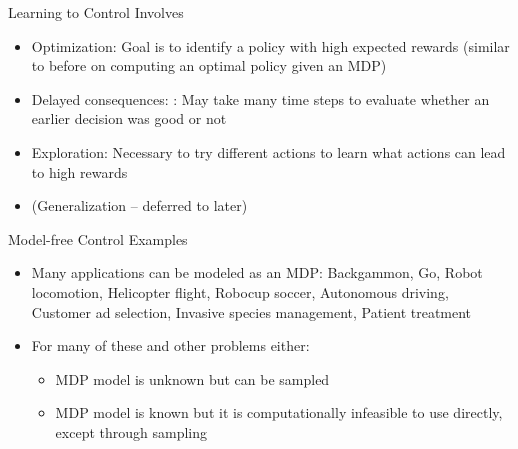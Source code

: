 \begin{frame}[c]{Learning to Control Involves}
	
	\begin{itemize}
		\item Optimization: Goal is to identify a policy with high expected rewards (similar to before on computing an optimal policy \alert{given} an MDP)
		\item Delayed consequences: : May take many time steps to evaluate whether an earlier decision was good or not
		\item Exploration: Necessary to try different actions to learn what actions can lead to high rewards
		\item (Generalization -- deferred to later)
	\end{itemize}
	
\end{frame}
\begin{frame}[c]{Model-free Control Examples}
	
	\begin{itemize}¸
		\item Many applications can be modeled as an MDP: Backgammon, Go, Robot locomotion, Helicopter flight, Robocup soccer, Autonomous driving, Customer ad selection, Invasive species management, Patient
		treatment
		\item For many of these and other problems either:
		\begin{itemize}
			\item MDP model is unknown but can be sampled
			\item MDP model is known but it is computationally infeasible to use directly, except through sampling
		\end{itemize}
	\end{itemize}
	
\end{frame}
